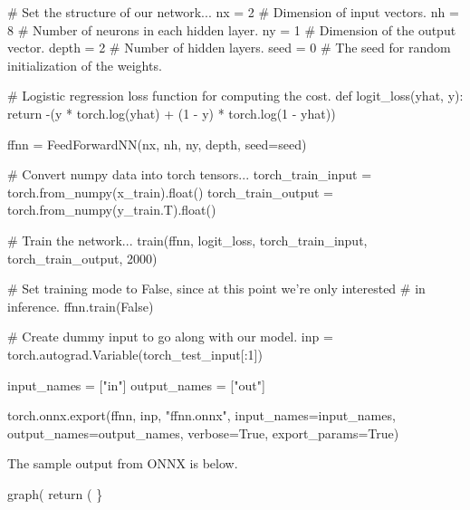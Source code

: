\begin{DoxyCode}
# Set the structure of our network...
nx    = 2    # Dimension of input vectors.
nh    = 8    # Number of neurons in each hidden layer.
ny    = 1    # Dimension of the output vector.
depth = 2    # Number of hidden layers.
seed  = 0    # The seed for random initialization of the weights.

# Logistic regression loss function for computing the cost.
def logit\_loss(yhat, y):
    return -(y * torch.log(yhat) + (1 - y) * torch.log(1 - yhat))

ffnn = FeedForwardNN(nx, nh, ny, depth, seed=seed)

# Convert numpy data into torch tensors...
torch\_train\_input = torch.from\_numpy(x\_train).float()
torch\_train\_output = torch.from\_numpy(y\_train.T).float()

# Train the network...
train(ffnn, logit\_loss, torch\_train\_input, torch\_train\_output, 2000)

# Set training mode to False, since at this point we're only interested
# in inference.
ffnn.train(False)

# Create dummy input to go along with our model.
inp = torch.autograd.Variable(torch\_test\_input[:1])

input\_names = ["in"]
output\_names = ["out"]

torch.onnx.export(ffnn, inp, "ffnn.onnx", input\_names=input\_names,
                  output\_names=output\_names, verbose=True, export\_params=True)
\end{DoxyCode}


The sample output from O\+N\+NX is below.


\begin{DoxyCode}
graph(%
return (%
\}
\end{DoxyCode}


